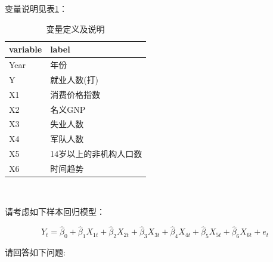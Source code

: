 \documentclass[12pt,(landscape,a4paper),(portrait,a4paper)]{article}
\begin{document}
变量说明见表\ref{tab:label-show}：

\begin{table}

\caption{\label{tab:label-show}变量定义及说明}
\centering
\begin{tabular}[t]{l|l}
\hline
variable & label\\
\hline
Year & 年份\\
\hline
Y & 就业人数(打)\\
\hline
X1 & 消费价格指数\\
\hline
X2 & 名义GNP\\
\hline
X3 & 失业人数\\
\hline
X4 & 军队人数\\
\hline
X5 & 14岁以上的非机构人口数\\
\hline
X6 & 时间趋势\\
\hline
\end{tabular}
\end{table}

~

请考虑如下样本回归模型：

\begin{equation}
Y_t=\hat{\beta}_0+\hat{\beta}_1X_{1t}+\hat{\beta}_2X_{2t}+\hat{\beta}_3X_{3t}+\hat{\beta}_4X_{4t}+\hat{\beta}_5X_{5t}+\hat{\beta}_6X_{6t}+e_{t}
\label{eq:model-longley}
\end{equation}

请回答如下问题:
\end{document}
